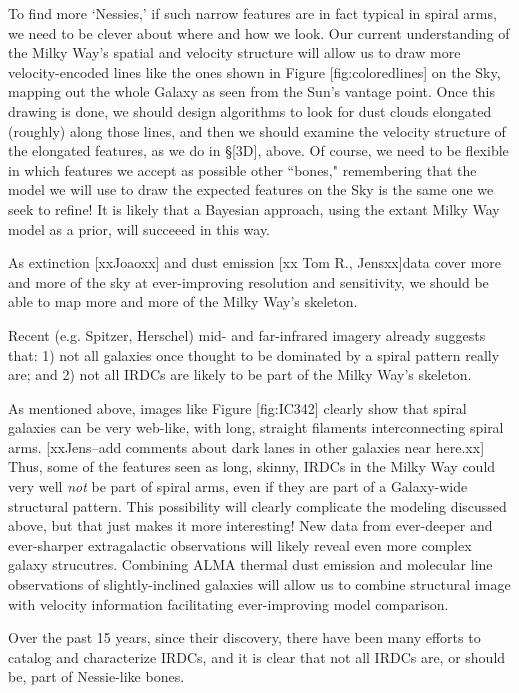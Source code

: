 \documentclass[]{article}
\begin{document}
To find more `Nessies,' if such narrow features are in fact typical in
spiral arms, we need to be clever about where and how we look. Our
current understanding of the Milky Way's spatial and velocity structure
will allow us to draw more velocity-encoded lines like the ones shown in
Figure {[}fig:coloredlines{]} on the Sky, mapping out the whole Galaxy
as seen from the Sun's vantage point. Once this drawing is done, we
should design algorithms to look for dust clouds elongated (roughly)
along those lines, and then we should examine the velocity structure of
the elongated features, as we do in §{[}3D{]}, above. Of course, we need
to be flexible in which features we accept as possible other ``bones,"
remembering that the model we will use to draw the expected features on
the Sky is the same one we seek to refine! It is likely that a Bayesian
approach, using the extant Milky Way model as a prior, will succeeed in
this way.

As extinction {[}xxJoaoxx{]} and dust emission {[}xx Tom R.,
Jensxx{]}data cover more and more of the sky at ever-improving
resolution and sensitivity, we should be able to map more and more of
the Milky Way's skeleton.

Recent (e.g. Spitzer, Herschel) mid- and far-infrared imagery already
suggests that: 1) not all galaxies once thought to be dominated by a
spiral pattern really are; and 2) not all IRDCs are likely to be part of
the Milky Way's skeleton.

As mentioned above, images like Figure {[}fig:IC342{]} clearly show that
spiral galaxies can be very web-like, with long, straight filaments
interconnecting spiral arms. {[}xxJens--add comments about dark lanes in
other galaxies near here.xx{]} Thus, some of the features seen as long,
skinny, IRDCs in the Milky Way could very well \emph{not} be part of
spiral arms, even if they are part of a Galaxy-wide structural pattern.
This possibility will clearly complicate the modeling discussed above,
but that just makes it more interesting! New data from ever-deeper and
ever-sharper extragalactic observations will likely reveal even more
complex galaxy strucutres. Combining ALMA thermal dust emission and
molecular line observations of slightly-inclined galaxies will allow us
to combine structural image with velocity information facilitating
ever-improving model comparison.

Over the past 15 years, since their discovery, there have been many
efforts to catalog and characterize IRDCs, and it is clear that not all
IRDCs are, or should be, part of Nessie-like bones.
\end{document}
